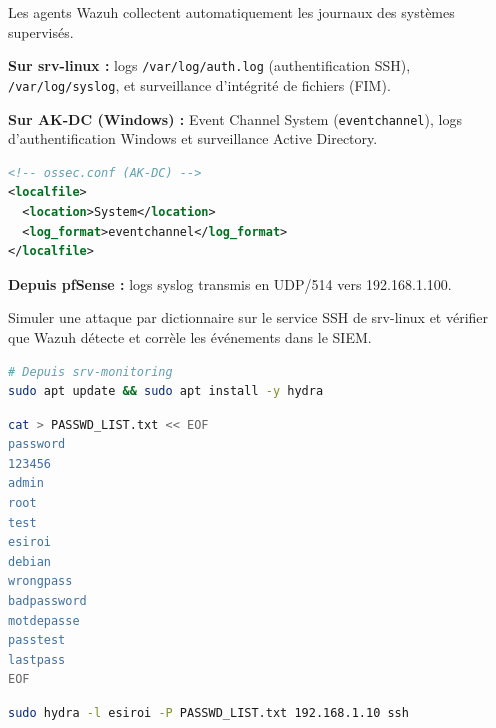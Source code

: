 \documentclass[a4paper,12pt,openany,oneside]{article}
\begin{document}

Les agents Wazuh collectent automatiquement les journaux des systèmes supervisés.

\textbf{Sur srv-linux :} logs \texttt{/var/log/auth.log} (authentification SSH), \texttt{/var/log/syslog}, et surveillance d'intégrité de fichiers (FIM).

\textbf{Sur AK-DC (Windows) :} Event Channel System (\texttt{eventchannel}), logs d'authentification Windows et surveillance Active Directory.

\begin{lstlisting}[language=xml]
<!-- ossec.conf (AK-DC) -->
<localfile>
  <location>System</location>
  <log_format>eventchannel</log_format>
</localfile>
\end{lstlisting}

\textbf{Depuis pfSense :} logs syslog transmis en UDP/514 vers 192.168.1.100.

\newpage



Simuler une attaque par dictionnaire sur le service SSH de srv-linux et vérifier que Wazuh détecte et corrèle les événements dans le SIEM.



\begin{lstlisting}[language=bash]
# Depuis srv-monitoring
sudo apt update && sudo apt install -y hydra
\end{lstlisting}


\begin{lstlisting}[language=bash]
cat > PASSWD_LIST.txt << EOF
password
123456
admin
root
test
esiroi
debian
wrongpass
badpassword
motdepasse
passtest
lastpass
EOF
\end{lstlisting}


\begin{lstlisting}[language=bash]
sudo hydra -l esiroi -P PASSWD_LIST.txt 192.168.1.10 ssh
\end{lstlisting}
\end{document}
